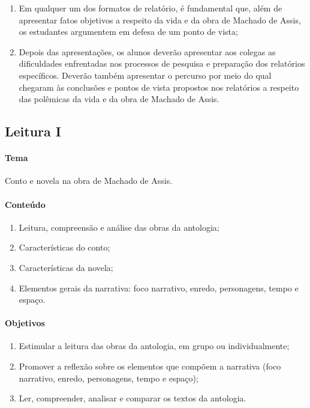 \documentclass{extarticle}
\begin{document}
\begin{enumerate}
\item Em qualquer um dos formatos de relatório, é fundamental que, além de
apresentar fatos objetivos a respeito da vida e da obra de Machado de
Assis, os estudantes argumentem em defesa de um ponto de vista;

\item Depois das apresentações, os alunos deverão apresentar aos colegas as
dificuldades enfrentadas nos processos de pesquisa e preparação dos
relatórios específicos. Deverão também apresentar o percurso por meio do
qual chegaram às conclusões e pontos de vista propostos nos relatórios a
respeito das polêmicas da vida e da obra de Machado de Assis.
\end{enumerate}

\subsection{Leitura I}


\paragraph{Tema} Conto e novela na obra de Machado de Assis.

\paragraph{Conteúdo} 

\begin{enumerate}
\item Leitura, compreensão e análise das obras da antologia; 
\item Características do conto; 
\item Características da novela; 
\item Elementos gerais da narrativa: foco narrativo, enredo, personagens,
tempo e espaço.
\end{enumerate}

\paragraph{Objetivos} 

\begin{enumerate}
\item Estimular a leitura das obras da antologia, em grupo ou individualmente; 
\item Promover a reflexão sobre os elementos que compõem a narrativa
(foco narrativo, enredo, personagens, tempo e espaço); 
\item Ler, compreender, analisar e comparar os textos da antologia.
\end{enumerate}
\end{document}
